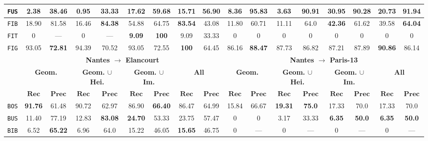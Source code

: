 \begin{sidewaystable}
\begin{center}
\begin{tabular}{|c | c c | c c | c c | c c || c c | c c | c c | c c |}
                    \hline
                    \texttt{FUS} & 2.38 & 38.46 & 0.95 & 33.33 & \textbf{17.62} & \textbf{59.68} & 15.71 & 56.90 & 8.36 & \textbf{95.83} & 3.63 & 90.91 & \textbf{30.95} & 90.28 & 20.73 & 91.94 \\
                    \hline
                    \texttt{FIB} & 18.90 & 81.58 & 16.46 & \textbf{84.38} & 54.88 & 64.75 & \textbf{83.54} & 43.08 & 11.80 & 60.71 & 11.11 & 64.0 & \textbf{42.36} & 61.62 & 39.58 & \textbf{64.04} \\ 
                    \hline
                    \texttt{FIT} & 0 & --- & 0 & --- & \textbf{9.09} & \textbf{100} & 9.09 & 33.33 & 0 & 0 & 0 & 0 & 0 & 0 & 0 & 0 \\
                    \hline
                    \texttt{FIG} & 93.05 & \textbf{72.81} & 94.39 & 70.52 & 93.05 & 72.55 & \textbf{100} & 64.45 & 86.16 & \textbf{88.47} & 87.73 & 86.82 & 87.21 & 87.89 & \textbf{90.86} & 86.14 \\
                    \hline
                    \hline
                    & \multicolumn{8}{c||}{\textbf{Nantes $\rightarrow$ Elancourt}} & \multicolumn{8}{c|}{\textbf{Nantes $\rightarrow$ Paris-13}}\\
                    \hline
                    &\multicolumn{2}{c|}{\textbf{Geom.}} & \multicolumn{2}{c|}{\textbf{Geom. $\cup$ Hei.}} & \multicolumn{2}{c|}{\textbf{Geom. $\cup$ Im.}} & \multicolumn{2}{c||}{\textbf{All}} & \multicolumn{2}{c|}{\textbf{Geom.}} & \multicolumn{2}{c|}{\textbf{Geom. $\cup$ Hei.}} & \multicolumn{2}{c|}{\textbf{Geom. $\cup$ Im.}} & \multicolumn{2}{x{1.5cm}|}{\textbf{All}}\\
                    \cline{2-17}
                    & \(\bm{Rec}\) & \(\bm{Prec}\) &  \(\bm{Rec}\) & \(\bm{Prec}\) &  \(\bm{Rec}\) & \(\bm{Prec}\) &  \(\bm{Rec}\) & \(\bm{Prec}\) & \(\bm{Rec}\) & \(\bm{Prec}\) &  \(\bm{Rec}\) & \(\bm{Prec}\) &  \(\bm{Rec}\) & \(\bm{Prec}\) &  \(\bm{Rec}\) & \(\bm{Prec}\) \\
                    \hline
                    \texttt{BOS} & \textbf{91.76} & 61.48 & 90.72 & 62.97 & 86.90 & \textbf{66.40} & 86.47 & 64.99 & 15.84 & 66.67 & \textbf{19.31} & \textbf{75.0} & 17.33 & 70.0 & 17.33 & 70.0 \\
                    \hline
                    \texttt{BUS} & 11.40 & 77.19 & 12.83 & \textbf{83.08} & \textbf{24.70} & 53.33 & 23.75 & 57.47 & 0 & 0 & 3.17 & 33.33 & \textbf{6.35} & \textbf{50.0} & \textbf{6.35} & \textbf{50.0} \\
                    \hline
                    \texttt{BIB} & 6.52 & \textbf{65.22} & 6.96 & 64.0 & 15.22 & 46.05 & \textbf{15.65} & 46.75 & 0 & --- & 0 & --- & 0 & --- & 0 & --- \\

\end{tabular}
\end{center}
\end{sidewaystable}

